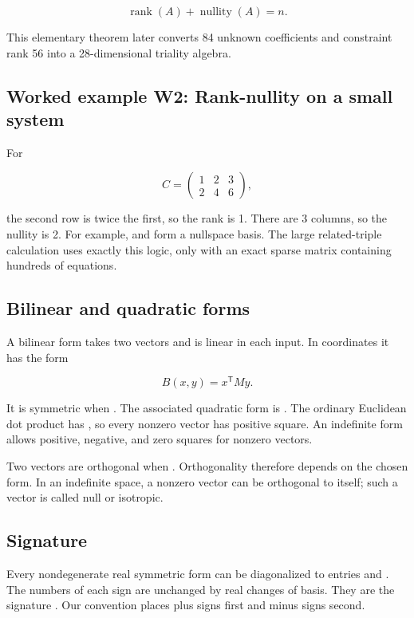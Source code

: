 \documentclass[11pt]{article}
\begin{document}
\[
\operatorname{rank}(A)+\operatorname{nullity}(A)=n.
\]

This elementary theorem later converts 84 unknown coefficients and constraint rank 56 into a 28-dimensional triality algebra.

\subsection{Worked example W2: Rank-nullity on a small system}

For

\[
C=\begin{pmatrix}1&2&3\\2&4&6\end{pmatrix},
\]

the second row is twice the first, so the rank is 1. There are 3 columns, so the nullity is 2. For example, \texttt{} and \texttt{} form a nullspace basis. The large related-triple calculation uses exactly this logic, only with an exact sparse matrix containing hundreds of equations.

\subsection{Bilinear and quadratic forms}

A bilinear form takes two vectors and is linear in each input. In coordinates it has the form

\[
B(x,y)=x^{\mathsf T}My.
\]

It is symmetric when \texttt{}. The associated quadratic form is \texttt{}. The ordinary Euclidean dot product has \texttt{}, so every nonzero vector has positive square. An indefinite form allows positive, negative, and zero squares for nonzero vectors.

Two vectors are orthogonal when \texttt{}. Orthogonality therefore depends on the chosen form. In an indefinite space, a nonzero vector can be orthogonal to itself; such a vector is called null or isotropic.

\subsection{Signature}

Every nondegenerate real symmetric form can be diagonalized to entries \texttt{} and \texttt{}. The numbers of each sign are unchanged by real changes of basis. They are the signature \texttt{}. Our convention places \texttt{} plus signs first and \texttt{} minus signs second.
\end{document}

